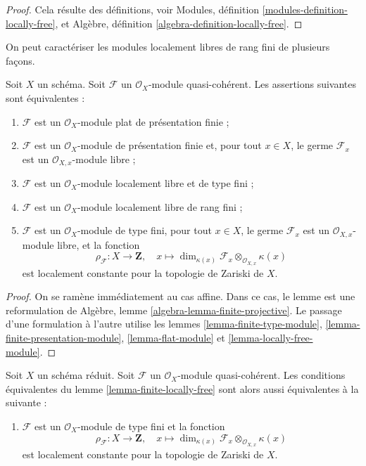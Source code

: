 \begin{proof}
Cela résulte des définitions, voir
Modules, définition \ref{modules-definition-locally-free},
et
Algèbre, définition \ref{algebra-definition-locally-free}.
\end{proof}

\noindent
On peut caractériser les modules localement libres de rang fini de plusieurs façons.

\begin{lemma}
\label{lemma-finite-locally-free}
Soit $X$ un schéma.
Soit $\mathcal{F}$ un $\mathcal{O}_X$-module quasi-cohérent.
Les assertions suivantes sont équivalentes :
\begin{enumerate}
\item $\mathcal{F}$ est un $\mathcal{O}_X$-module plat de présentation finie ;
\item $\mathcal{F}$ est un $\mathcal{O}_X$-module de présentation finie et,
pour tout $x \in X$, le germe $\mathcal{F}_x$ est un
$\mathcal{O}_{X, x}$-module libre ;
\item $\mathcal{F}$ est un $\mathcal{O}_X$-module localement libre et de type fini ;
\item $\mathcal{F}$ est un $\mathcal{O}_X$-module localement libre de rang fini ;
\item $\mathcal{F}$ est un $\mathcal{O}_X$-module de type fini,
pour tout $x \in X$, le germe $\mathcal{F}_x$ est un
$\mathcal{O}_{X, x}$-module libre, et la fonction
$$
\rho_\mathcal{F} : X \to \mathbf{Z}, \quad
x \longmapsto
\dim_{\kappa(x)} \mathcal{F}_x \otimes_{\mathcal{O}_{X, x}} \kappa(x)
$$
est localement constante pour la topologie de Zariski de $X$.
\end{enumerate}
\end{lemma}

\begin{proof}
On se ramène immédiatement au cas affine.
Dans ce cas, le lemme est une reformulation de
Algèbre, lemme \ref{algebra-lemma-finite-projective}.
Le passage d'une formulation à l'autre utilise les
lemmes \ref{lemma-finite-type-module},
\ref{lemma-finite-presentation-module},
\ref{lemma-flat-module} et
\ref{lemma-locally-free-module}.
\end{proof}

\begin{lemma}
\label{lemma-finite-locally-free-reduced}
Soit $X$ un schéma réduit. Soit $\mathcal{F}$ un
$\mathcal{O}_X$-module quasi-cohérent. Les conditions équivalentes du
lemme \ref{lemma-finite-locally-free} sont alors aussi équivalentes à la suivante :
\begin{enumerate}
\item[(6)] $\mathcal{F}$ est un $\mathcal{O}_X$-module de type fini et
la fonction
$$
\rho_\mathcal{F} : X \to \mathbf{Z}, \quad
x \longmapsto
\dim_{\kappa(x)} \mathcal{F}_x \otimes_{\mathcal{O}_{X, x}} \kappa(x)
$$
est localement constante pour la topologie de Zariski de $X$.
\end{enumerate}
\end{lemma}

